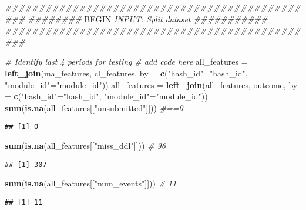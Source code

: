 \documentclass[
]{article}
\newenvironment{Shaded}{\begin{snugshade}}{\end{snugshade}}
\newcommand{\CommentTok}[1]{\textcolor[rgb]{0.56,0.35,0.01}{\textit{#1}}}
\newcommand{\DataTypeTok}[1]{\textcolor[rgb]{0.13,0.29,0.53}{#1}}
\newcommand{\KeywordTok}[1]{\textcolor[rgb]{0.13,0.29,0.53}{\textbf{#1}}}
\newcommand{\NormalTok}[1]{#1}
\newcommand{\RegionMarkerTok}[1]{#1}
\newcommand{\StringTok}[1]{\textcolor[rgb]{0.31,0.60,0.02}{#1}}
\begin{document}
\begin{Shaded}
\begin{Highlighting}[]
\CommentTok{############################################### }
\CommentTok{######## }\RegionMarkerTok{BEGIN}\CommentTok{ INPUT: Split dataset ###########}
\CommentTok{###############################################}

\CommentTok{# Identify last 4 periods for testing}
\CommentTok{# add code here}
\NormalTok{all_features =}\StringTok{ }\KeywordTok{left_join}\NormalTok{(ma_features, cl_features, }\DataTypeTok{by =} \KeywordTok{c}\NormalTok{(}\StringTok{"hash_id"}\NormalTok{=}\StringTok{"hash_id"}\NormalTok{, }\StringTok{"module_id"}\NormalTok{=}\StringTok{"module_id"}\NormalTok{))}
\NormalTok{all_features =}\StringTok{ }\KeywordTok{left_join}\NormalTok{(all_features, outcome, }\DataTypeTok{by =} \KeywordTok{c}\NormalTok{(}\StringTok{"hash_id"}\NormalTok{=}\StringTok{"hash_id"}\NormalTok{, }\StringTok{"module_id"}\NormalTok{=}\StringTok{"module_id"}\NormalTok{))}
\KeywordTok{sum}\NormalTok{(}\KeywordTok{is.na}\NormalTok{(all_features[[}\StringTok{"unsubmitted"}\NormalTok{]])) }\CommentTok{#==0}
\end{Highlighting}
\end{Shaded}

\begin{verbatim}
## [1] 0
\end{verbatim}

\begin{Shaded}
\begin{Highlighting}[]
\KeywordTok{sum}\NormalTok{(}\KeywordTok{is.na}\NormalTok{(all_features[[}\StringTok{"miss_ddl"}\NormalTok{]])) }\CommentTok{# 96}
\end{Highlighting}
\end{Shaded}

\begin{verbatim}
## [1] 307
\end{verbatim}

\begin{Shaded}
\begin{Highlighting}[]
\KeywordTok{sum}\NormalTok{(}\KeywordTok{is.na}\NormalTok{(all_features[[}\StringTok{"num_events"}\NormalTok{]])) }\CommentTok{# 11}
\end{Highlighting}
\end{Shaded}

\begin{verbatim}
## [1] 11
\end{verbatim}
\end{document}
